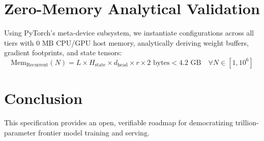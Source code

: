 \documentclass[11pt,a4paper]{article}
\begin{document}
\section{Zero-Memory Analytical Validation}
Using PyTorch's meta-device subsystem, we instantiate configurations across all tiers with $0\text{ MB}$ CPU/GPU host memory, analytically deriving weight buffers, gradient footprints, and state tensors:
\begin{equation}
\text{Mem}_{\text{Recurrent}}(N) = L \times H_{\text{state}} \times d_{\text{head}} \times r \times 2\text{ bytes} < 4.2\text{ GB} \quad \forall N \in [1, 10^6]
\end{equation}

\section{Conclusion}
This specification provides an open, verifiable roadmap for democratizing trillion-parameter frontier model training and serving.
\end{document}
